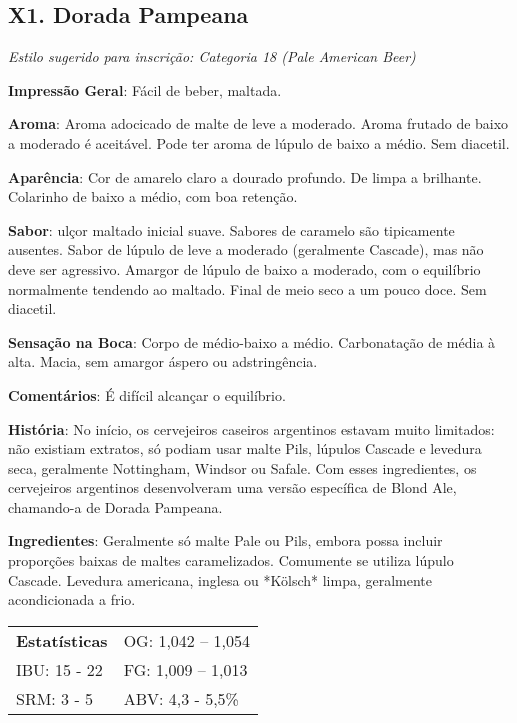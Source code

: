 \subsection*{X1. Dorada Pampeana}

\textit{Estilo sugerido para inscrição: Categoria 18 (Pale American Beer)}

\textbf{Impressão Geral}: Fácil de beber, maltada.

\textbf{Aroma}: Aroma adocicado de malte de leve a moderado. Aroma frutado de baixo a moderado é aceitável. Pode ter aroma de lúpulo de baixo a médio. Sem diacetil.

\textbf{Aparência}: Cor de amarelo claro a dourado profundo. De limpa a brilhante. Colarinho de baixo a médio, com boa retenção.

\textbf{Sabor}: ulçor maltado inicial suave. Sabores de caramelo são tipicamente ausentes. Sabor de lúpulo de leve a moderado (geralmente Cascade), mas não deve ser agressivo. Amargor de lúpulo de baixo a moderado, com o equilíbrio normalmente tendendo ao maltado. Final de meio seco a um pouco doce. Sem diacetil.

\textbf{Sensação na Boca}: Corpo de médio-baixo a médio. Carbonatação de média à alta. Macia, sem amargor áspero ou adstringência.

\textbf{Comentários}: É difícil alcançar o equilíbrio.

\textbf{História}: No início, os cervejeiros caseiros argentinos estavam muito limitados: não existiam extratos, só podiam usar malte Pils, lúpulos Cascade e levedura seca, geralmente Nottingham, Windsor ou Safale. Com esses ingredientes, os cervejeiros argentinos desenvolveram uma versão específica de Blond Ale, chamando-a de Dorada Pampeana.

\textbf{Ingredientes}: Geralmente só malte Pale ou Pils, embora possa incluir proporções baixas de maltes caramelizados. Comumente se utiliza lúpulo Cascade. Levedura americana, inglesa ou *Kölsch* limpa, geralmente acondicionada a frio.

\begin{tabular}{@{}p{35mm}p{35mm}@{}}
  \textbf{Estatísticas} & OG: 1,042 – 1,054 \\
  IBU: 15 - 22 & FG: 1,009 – 1,013 \\
  SRM: 3 - 5 & ABV: 4,3 - 5,5\%
\end{tabular}